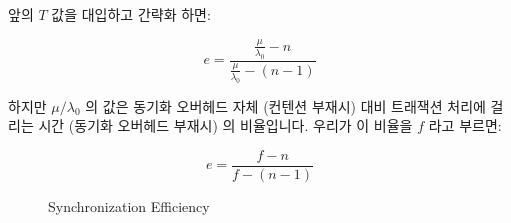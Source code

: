 앞의 $T$ 값을 대입하고 간략화 하면:

\begin{equation}
	e = \frac{\frac{\mu}{\lambda_0} - n}{\frac{\mu}{\lambda_0} - (n - 1)}
\end{equation}

하지만 $\mu / \lambda_0$ 의 값은 동기화 오버헤드 자체 (컨텐션 부재시) 대비
트래잭션 처리에 걸리는 시간 (동기화 오버헤드 부재시) 의 비율입니다.
우리가 이 비율을 $f$ 라고 부르면:

\begin{equation}
	e = \frac{f - n}{f - (n - 1)}
\end{equation}

\begin{figure}[tbp]
\centering
{}
\caption{Synchronization Efficiency}
\label{fig:SMPdesign:Synchronization Efficiency}
\end{figure}

